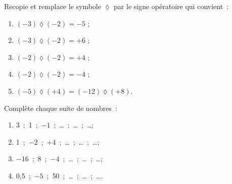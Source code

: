 \begin{exercice}
Recopie et remplace le symbole $\lozenge$ par le signe opératoire qui convient :
\begin{enumerate}
 \item $(-3) \lozenge (-2) = -5$ ;
 \item $(-3) \lozenge (-2) = +6$ ;
 \item $(-2) \lozenge (-2) = +4$ ;
 \item $(-2) \lozenge (-2) = -4$ ;
 \item $(-5) \lozenge (+4) = (-12) \lozenge (+8)$.
 \end{enumerate}
\end{exercice}


\begin{exercice}[Logique !]
Complète chaque suite de nombres :
\begin{enumerate}
 \item 3 ; 1 ; $-1$ ; \ldots ; \ldots ; \ldots ;
 \item 1 ; $-2$ ; $+4$ ; \ldots ; \ldots ; \ldots ;
 \item $-16$ ; 8 ; $-4$ ; \ldots ; \ldots ; \ldots ;
 \item 0,5 ; $- 5$ ; 50 ; \ldots ; \ldots ; \ldots .
 \end{enumerate}
\end{exercice}


